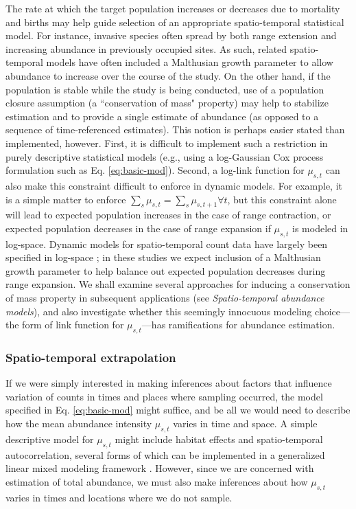 \documentclass[12pt,english]{article}
\begin{document}
\begin{spacing}{1.9}
The rate at which the target population increases or decreases due to mortality and births may help guide selection
of an appropriate spatio-temporal statistical model.  For instance, invasive species often spread by both range extension and increasing abundance in previously occupied sites.  As such, related spatio-temporal models have often included a Malthusian growth parameter \citep{Wikle2003,HootenWikle2008} to allow abundance to increase over the course of the study.  On the other hand, if the population is stable while the study is being conducted, use of a population closure assumption (a ``conservation of mass" property) may help to stabilize estimation and to provide a single estimate of abundance (as opposed to a sequence of time-referenced estimates).  This notion is perhaps easier stated than implemented, however. First, it is difficult to implement such a restriction in purely descriptive statistical models (e.g., using a log-Gaussian Cox process formulation such as Eq. \ref{eq:basic-mod}). Second, a log-link function for $\mu_{s,t}$ can also make this constraint difficult to enforce in dynamic models.  For example, it is a simple matter to enforce $\sum_s \mu_{s,t} = \sum_s \mu_{s,t+1} \forall t$, but this constraint alone will lead to expected population increases in the case of range contraction, or expected population decreases in the case of range expansion if $\mu_{s,t}$ is modeled in log-space.  Dynamic models for spatio-temporal count data have largely been specified in log-space \citep[e.g.,][]{Wikle2003,HootenWikle2008}; in these studies we expect inclusion of a Malthusian growth parameter to help balance out expected population decreases during range expansion.
We shall examine several approaches for inducing a conservation of mass property in subsequent applications (see {\it Spatio-temporal abundance models}), and also investigate whether this seemingly innocuous modeling choice---the form of link function for $\mu_{s,t}$---has ramifications for abundance estimation.

\subsubsection{Spatio-temporal extrapolation}

If we were simply interested in making inferences about factors that influence variation of counts in times and places where sampling occurred, the model specified in Eq. \ref{eq:basic-mod} might suffice, and be all we would need to describe how the mean abundance intensity $\mu_{s,t}$ varies in time and space.  A simple descriptive model for $\mu_{s,t}$ might include habitat effects and spatio-temporal autocorrelation, several forms of which can be implemented in a generalized linear mixed modeling framework \citep{RossEtAl2012}.  However, since we are concerned with estimation of total abundance, we must also make inferences about how $\mu_{s,t}$ varies in times and locations where we do not sample.


\end{spacing}
\end{document}
